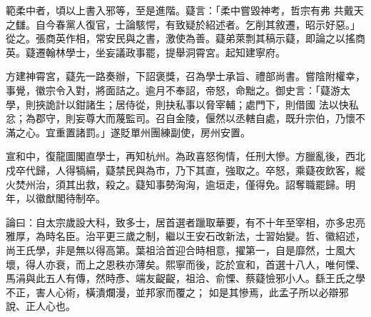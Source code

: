 \begin{pinyinscope}
 範柔中者，頃以上書入邪等，至是進階。薿言：「柔中嘗毀神考，哲宗有弗
 共戴天之讎。自今春黨人復官，士論駭愕，有致疑於紹述者。乞削其敘遷，昭示好惡。」從之。張商英作相，常安民與之書，激使為善。薿弟萊剽其稿示薿，即論之以搖商英。薿遷翰林學士，坐妄議政事罷，提舉洞霄宮。起知建寧府。



 方建神霄宮，薿先一路奏辦，下詔褒獎，召為學士承旨、禮部尚書。嘗陰附權幸，事覺，徽宗令入對，將面詰之。逾月不奉詔，帝怒，命黜之。御史言：「薿游太學，則挾詭計以鉗諸生；居侍從，則抉私事以脅宰輔；處門下，則借國
 法以快私忿；為郡守，則妄尊大而蔑監司。召自金陵，偃然以丞轄自處，既升宗伯，乃懷不滿之心。宜重置諸罰。」遂貶單州團練副使，房州安置。



 宣和中，復龍圖閣直學士，再知杭州。為政喜怒徇情，任刑大慘。方臘亂後，西北戍卒代歸，人得犒絹，薿禁民與為市，乃下其直，強取之。卒怒，乘薿夜飲客，縱火焚州治，須其出救，殺之。薿知事勢洶洶，逾垣走，僅得免。詔奪職罷歸。明年，以徽猷閣待制卒。



 論曰：自太宗歲設大科，致多士，居首選者躐取華要，有不十年至宰相，亦多忠亮雅厚，為時名臣。治平更三歲之制，繼以王安石改新法，士習始變。哲、徽紹述，尚王氏學，非是無以得高第。葉祖洽首迎合時相意，擢第一，自是靡然，士風大壞，得人亦衰，而上之恩秩亦薄矣。熙寧而後，訖於宣和，首選十八人，唯何慄、馬涓與此五人有傳，然時彥、端友齪齪，祖洽、俞慄、蔡薿憸邪小人。繇王氏之學不正，害人心術，橫潰爛漫，並邦家而覆之；
 如是其慘焉，此孟子所以必辯邪說、正人心也。



\end{pinyinscope}